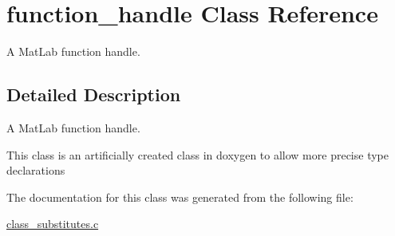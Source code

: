 \hypertarget{classfunction__handle}{\section{function\-\_\-handle Class Reference}
\label{classfunction__handle}
}


A Mat\-Lab function handle.  




\subsection{Detailed Description}
A Mat\-Lab function handle. 

This class is an artificially created class in doxygen to allow more precise type declarations 

The documentation for this class was generated from the following file\-:\begin{DoxyCompactItemize}
\item 
\hyperlink{class__substitutes_8c}{class\-\_\-substitutes.\-c}\end{DoxyCompactItemize}
